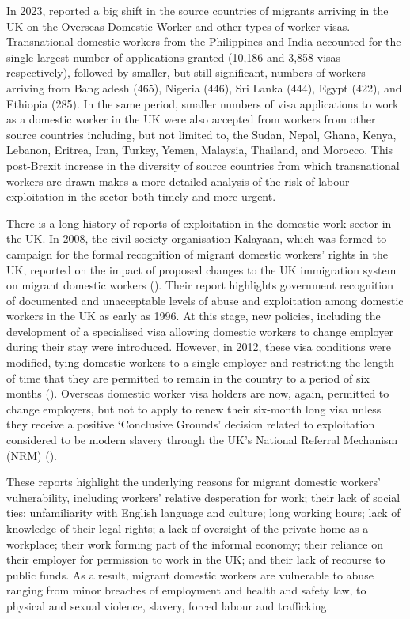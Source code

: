 \documentclass[
  12pt,
  letterpaper,
  DIV=11,
  numbers=noendperiod]{scrartcl}
\theoremstyle{plain}
\theoremstyle{definition}
\begin{document}
In 2023, \textcite{strauss_britain_2023} reported a big shift in the
source countries of migrants arriving in the UK on the Overseas Domestic
Worker and other types of worker visas. Transnational domestic workers
from the Philippines and India accounted for the single largest number
of applications granted (10,186 and 3,858 visas respectively), followed
by smaller, but still significant, numbers of workers arriving from
Bangladesh (465), Nigeria (446), Sri Lanka (444), Egypt (422), and
Ethiopia (285). In the same period, smaller numbers of visa applications
to work as a domestic worker in the UK were also accepted from workers
from other source countries including, but not limited to, the Sudan,
Nepal, Ghana, Kenya, Lebanon, Eritrea, Iran, Turkey, Yemen, Malaysia,
Thailand, and Morocco. This post-Brexit increase in the diversity of
source countries from which transnational workers are drawn makes a more
detailed analysis of the risk of labour exploitation in the sector both
timely and more urgent.

There is a long history of reports of exploitation in the domestic work
sector in the UK. In 2008, the civil society organisation Kalayaan,
which was formed to campaign for the formal recognition of migrant
domestic workers' rights in the UK, reported on the impact of proposed
changes to the UK immigration system on migrant domestic workers
(\textcite{kalayaan_new_2008}). Their report highlights government
recognition of documented and unacceptable levels of abuse and
exploitation among domestic workers in the UK as early as 1996. At this
stage, new policies, including the development of a specialised visa
allowing domestic workers to change employer during their stay were
introduced. However, in 2012, these visa conditions were modified, tying
domestic workers to a single employer and restricting the length of time
that they are permitted to remain in the country to a period of six
months (\textcite{gower_calls_2016}). Overseas domestic worker visa
holders are now, again, permitted to change employers, but not to apply
to renew their six-month long visa unless they receive a positive
`Conclusive Grounds' decision related to exploitation considered to be
modern slavery through the UK's National Referral Mechanism (NRM)
(\textcite{romero_blueprint_2025}).

These reports highlight the underlying reasons for migrant domestic
workers' vulnerability, including workers' relative desperation for
work; their lack of social ties; unfamiliarity with English language and
culture; long working hours; lack of knowledge of their legal rights; a
lack of oversight of the private home as a workplace; their work forming
part of the informal economy; their reliance on their employer for
permission to work in the UK; and their lack of recourse to public
funds. As a result, migrant domestic workers are vulnerable to abuse
ranging from minor breaches of employment and health and safety law, to
physical and sexual violence, slavery, forced labour and trafficking.
\end{document}
